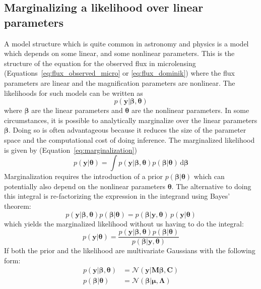 \documentclass[12pt,dvipsnames]{report}
\newcommand{\ud}{\,\mathrm{d}}
\renewcommand{\vec}[1]{\boldsymbol{\mathbf{#1}}}
\begin{document}
\subsection{Marginalizing a likelihood over linear parameters}
\label{ssec:marginalize_linear}
A model structure which is quite common in astronomy and physics is a model
which depends on some linear, and some nonlinear parameters. This is the
structure of the equation for the observed flux in microlensing
(Equations~\ref{eq:flux_observed_micro} or \ref{eq:flux_dominik}) where the
flux parameters are linear and the magnification parameters are nonlinear. The
likelihoods for such models can be written as
\begin{equation}
    p(\vec{y}\lvert \vec\beta, \vec{\theta})
\end{equation}
where $\vec\beta$ are the linear parameters and $\vec{\theta}$ are the nonlinear parameters.
In some circumstances, it is possible to analytically marginalize over the linear
parameters $\vec\beta$. Doing so is often advantageous because it reduces the size of the
parameter space  and the computational cost of doing inference.
The marginalized likelihood is given by (Equation~\ref{eq:marginalization})
\begin{equation}
    p(\vec{y}\lvert \vec{\theta})=\int p(\vec{y}\lvert \vec\beta, \vec{\theta})p(\vec\beta\lvert \vec{\theta}) \ud\vec\beta
\end{equation}
Marginalization requires the introduction of a prior  $p(\vec\beta\lvert \vec{\theta})$
which can potentially also depend on the nonlinear parameters $\vec{\theta}$.
The alternative to doing this integral is re-factorizing the expression in the integrand
using Bayes' theorem:
\begin{equation}
    p(\vec{y}\lvert \vec\beta, \vec{\theta})p(\vec\beta\lvert \vec{\theta})  = p(\vec\beta\lvert \vec{y},\vec{\theta})\,p(\vec{y}\lvert \vec{\theta})
\end{equation}
which yields the marginalized likelihood without us having to do the integral:
\begin{equation}
    p(\vec{y}\lvert \vec{\theta}) = \frac{    p(\vec{y}\lvert \vec\beta, \vec{\theta})p(\vec\beta\lvert \vec{\theta})}{p(\vec\beta\lvert \vec{y},\vec{\theta})}
    \label{eq:likelihood_factorization}
\end{equation}
If both the prior and the likelihood are multivariate Gaussians with the following form:
\begin{align}
    p(\vec{y}\lvert \vec\beta, \vec{\theta}) & = \mathcal{N}(\vec{y}\lvert \vec{M}\vec\beta,\vec{C})  \\
    p(\vec\beta\lvert \vec{\theta})          & = \mathcal{N}(\vec\beta\lvert \vec{\mu},\vec{\Lambda})
\end{align}
\end{document}
